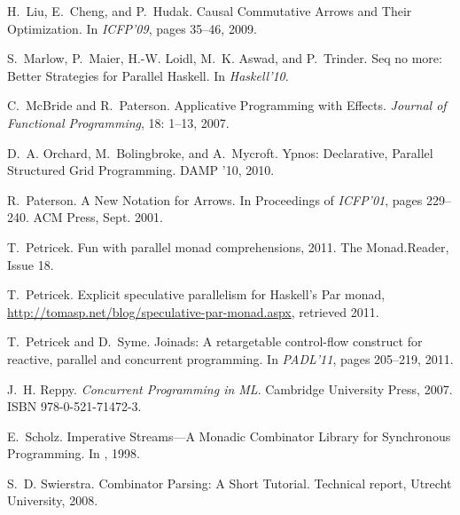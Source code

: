 \documentclass{sigplanconf}
\begin{document}
\begin{thebibliography}{37}
H.~Liu, E.~Cheng, and P.~Hudak.
\newblock Causal Commutative Arrows and Their Optimization.
\newblock In \emph{ICFP'09}, pages 35--46, 2009.

S.~Marlow, P.~Maier, H.-W. Loidl, M.~K. Aswad, and P.~Trinder.
\newblock Seq no more: Better Strategies for Parallel Haskell.
\newblock In \emph{Haskell'10}.

C.~McBride and R.~Paterson.
\newblock Applicative Programming with Effects.
\newblock \emph{Journal of Functional Programming}, 18: 1--13, 2007.

D.~A. Orchard, M.~Bolingbroke, and A.~Mycroft.
\newblock Ypnos: Declarative, Parallel Structured Grid Programming.
\newblock DAMP '10, 2010.

R.~Paterson.
\newblock A New Notation for Arrows.
\newblock In Proceedings of \emph{ICFP'01}, pages
  229--240. ACM Press, Sept. 2001.

T.~Petricek.
\newblock Fun with parallel monad comprehensions, 2011{}.
\newblock The Monad.Reader, Issue 18.

T.~Petricek.
\newblock Explicit speculative parallelism for Haskell's Par monad,
\url{http://tomasp.net/blog/speculative-par-monad.aspx}, retrieved 2011.

T.~Petricek and D.~Syme.
\newblock Joinads: A retargetable control-flow construct for reactive, parallel
  and concurrent programming.
\newblock In \emph{PADL'11}, pages 205--219, 2011.

J.~H. Reppy.
\newblock \emph{Concurrent Programming in ML}.
\newblock Cambridge University Press, 2007.
\newblock ISBN 978-0-521-71472-3.

E.~Scholz.
\newblock Imperative Streams---A Monadic Combinator Library for Synchronous Programming.
\newblock In , 1998.

S.~D. Swierstra.
\newblock Combinator Parsing: A Short Tutorial.
\newblock Technical report, Utrecht University, 2008.


\end{thebibliography}
\end{document}
